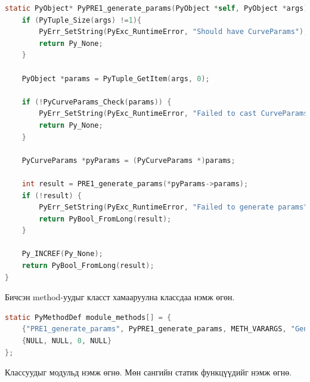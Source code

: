 \begin{lstlisting}[language=C, caption={Method-ууд}]
static PyObject* PyPRE1_generate_params(PyObject *self, PyObject *args) {
    if (PyTuple_Size(args) !=1){
        PyErr_SetString(PyExc_RuntimeError, "Should have CurveParams");
        return Py_None;
    }

    PyObject *params = PyTuple_GetItem(args, 0);

    if (!PyCurveParams_Check(params)) {
        PyErr_SetString(PyExc_RuntimeError, "Failed to cast CurveParams");
        return Py_None;
    }

    PyCurveParams *pyParams = (PyCurveParams *)params;

    int result = PRE1_generate_params(*pyParams->params);
    if (!result) {
        PyErr_SetString(PyExc_RuntimeError, "Failed to generate params");
        return PyBool_FromLong(result);
    }

    Py_INCREF(Py_None);
    return PyBool_FromLong(result);
}
\end{lstlisting}

\noindent Бичсэн method-уудыг класст хамааруулна классдаа нэмж өгөн.

\begin{lstlisting}[language=C, caption={Method-уудыг класст хамааруулна.}]
static PyMethodDef module_methods[] = {
    {"PRE1_generate_params", PyPRE1_generate_params, METH_VARARGS, "Generate curve parameters for the PRE1 scheme."},
    {NULL, NULL, 0, NULL}
};
\end{lstlisting}
\noindent Классуудыг модульд нэмж өгнө. Мөн сангийн статик функцүүдийг нэмж өгнө.

